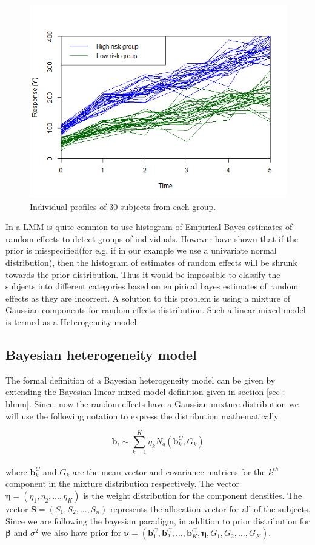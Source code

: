 \begin{figure}
	\centering
	\includegraphics[scale=0.5]{mainmatter/chapter_3_blmm/random_slope_dummy_data.png}
	\caption{Individual profiles of 30 subjects from each group.}
	\label{fig : random_slope_dummy_data}
\end{figure}

In a LMM is quite common to use histogram of Empirical Bayes estimates of random effects to detect groups of individuals. However \citet{verbeke_linear_1996} have shown that if the prior is misspecified(for e.g. if in our example we use a univariate normal distribution), then the histogram of estimates of random effects will be shrunk towards the prior distribution. Thus it would be impossible to classify the subjects into different categories based on empirical bayes estimates of random effects as they are incorrect. A solution to this problem is using a mixture of Gaussian components for random effects distribution. Such a linear mixed model is termed as a Heterogeneity model.

\subsection{Bayesian heterogeneity model}
\label{subsec : bhtge}
The formal definition of a Bayesian heterogeneity model can be given by extending the Bayesian linear mixed model definition given in section \ref{sec : blmm}. Since, now the random effects have a Gaussian mixture distribution we will use the following notation to express the distribution mathematically.

$$\boldsymbol{b}_i \sim \sum_{k=1}^{K} \eta_k N_q(\boldsymbol{b}_k^C, G_k)$$\\
where $\boldsymbol{b}_k^C$ and $G_k$ are the mean vector and covariance matrices for the $k^{th}$ component in the mixture distribution respectively. The vector $\boldsymbol{\eta} = (\eta_1, \eta_2, \ldots, \eta_K)$ is the weight distribution for the component densities. The vector $\boldsymbol{S}=(S_1, S_2, ..., S_n)$ represents the allocation vector for all of the subjects. Since we are following the bayesian paradigm, in addition to prior distribution for $\boldsymbol{\beta}$ and $\sigma^2$ we also have prior for $\boldsymbol{\nu} = (\boldsymbol{b}_1^C, \boldsymbol{b}_2^C, \ldots, \boldsymbol{b}_K^C, \boldsymbol{\eta}, G_1, G_2, \ldots, G_K)$.